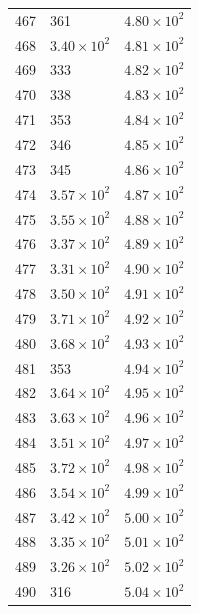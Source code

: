 \begin{table}[H]
\begin{tabular}{lll}
467 & 361 & $\displaystyle 4.80 \times 10^{2}$ \\
468 & $\displaystyle 3.40 \times 10^{2}$ & $\displaystyle 4.81 \times 10^{2}$ \\
469 & 333 & $\displaystyle 4.82 \times 10^{2}$ \\
470 & 338 & $\displaystyle 4.83 \times 10^{2}$ \\
471 & 353 & $\displaystyle 4.84 \times 10^{2}$ \\
472 & 346 & $\displaystyle 4.85 \times 10^{2}$ \\
473 & 345 & $\displaystyle 4.86 \times 10^{2}$ \\
474 & $\displaystyle 3.57 \times 10^{2}$ & $\displaystyle 4.87 \times 10^{2}$ \\
475 & $\displaystyle 3.55 \times 10^{2}$ & $\displaystyle 4.88 \times 10^{2}$ \\
476 & $\displaystyle 3.37 \times 10^{2}$ & $\displaystyle 4.89 \times 10^{2}$ \\
477 & $\displaystyle 3.31 \times 10^{2}$ & $\displaystyle 4.90 \times 10^{2}$ \\
478 & $\displaystyle 3.50 \times 10^{2}$ & $\displaystyle 4.91 \times 10^{2}$ \\
479 & $\displaystyle 3.71 \times 10^{2}$ & $\displaystyle 4.92 \times 10^{2}$ \\
480 & $\displaystyle 3.68 \times 10^{2}$ & $\displaystyle 4.93 \times 10^{2}$ \\
481 & 353 & $\displaystyle 4.94 \times 10^{2}$ \\
482 & $\displaystyle 3.64 \times 10^{2}$ & $\displaystyle 4.95 \times 10^{2}$ \\
483 & $\displaystyle 3.63 \times 10^{2}$ & $\displaystyle 4.96 \times 10^{2}$ \\
484 & $\displaystyle 3.51 \times 10^{2}$ & $\displaystyle 4.97 \times 10^{2}$ \\
485 & $\displaystyle 3.72 \times 10^{2}$ & $\displaystyle 4.98 \times 10^{2}$ \\
486 & $\displaystyle 3.54 \times 10^{2}$ & $\displaystyle 4.99 \times 10^{2}$ \\
487 & $\displaystyle 3.42 \times 10^{2}$ & $\displaystyle 5.00 \times 10^{2}$ \\
488 & $\displaystyle 3.35 \times 10^{2}$ & $\displaystyle 5.01 \times 10^{2}$ \\
489 & $\displaystyle 3.26 \times 10^{2}$ & $\displaystyle 5.02 \times 10^{2}$ \\
490 & 316 & $\displaystyle 5.04 \times 10^{2}$ \\

\end{tabular}
\end{table}
